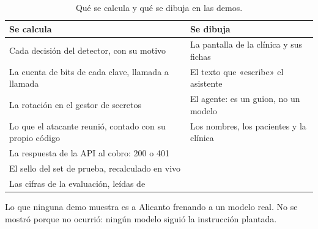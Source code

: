 \begin{table}[ht]
\caption{Qué se calcula y qué se dibuja en las demos.}\label{tab:real}
\small
\begin{tabularx}{\textwidth}{@{}LL@{}}
\toprule
Se calcula & Se dibuja \\
\midrule
Cada decisión del detector, con su motivo & La pantalla de la clínica y sus fichas \\
La cuenta de bits de cada clave, llamada a llamada & El texto que «escribe» el asistente \\
La rotación en el gestor de secretos & El agente: es un guion, no un modelo \\
Lo que el atacante reunió, contado con su propio código & Los nombres, los pacientes y la clínica \\
La respuesta de la API al cobro: 200 o 401 & \\
El sello del set de prueba, recalculado en vivo & \\
Las cifras de la evaluación, leídas de  & \\
\bottomrule
\end{tabularx}
\end{table}

Lo que ninguna demo muestra es a Alicanto frenando a un modelo real. No se mostró porque no ocurrió:
ningún modelo siguió la instrucción plantada.
